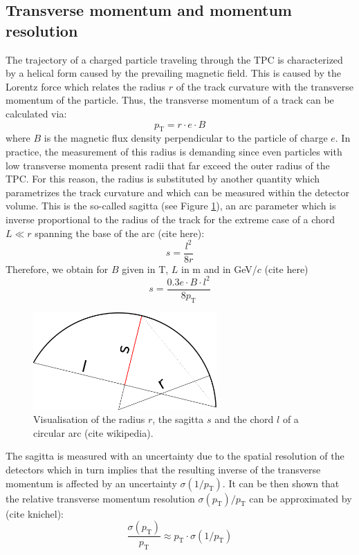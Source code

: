 \documentclass[12pt,a4paper]{report}
\begin{document}
\subsection{Transverse momentum and momentum resolution}
\label{ptandmomreso}
The trajectory of a charged particle traveling through the TPC is characterized by a helical form caused by the prevailing magnetic field. This is caused by the Lorentz force which relates the radius $r$ of the track curvature with the transverse momentum \pt of the particle. Thus, the transverse momentum of a track can be calculated via:
\begin{equation}
p_\text{T} = r \cdot e\cdot B
\label{radius}
\end{equation}
where $B$ is the magnetic flux density perpendicular to the particle of charge $e$. In practice, the measurement of this radius is demanding since even particles with low transverse momenta present radii that far exceed the outer radius of the TPC. For this reason, the radius is substituted by another quantity which parametrizes the track curvature and which can be measured within the detector volume. This is the so-called sagitta (see Figure \ref{Sagitta}), an arc parameter which is inverse proportional to the radius of the track for the extreme case of a chord $L \ll r$ spanning the base of the arc (cite here):
\begin{equation}
s = \dfrac{l^2}{8r}
\end{equation}
Therefore, we obtain for $B$ given in T, $L$ in m and \pt in GeV/$c$ (cite here)
\begin{equation}
s = \dfrac{0.3e \cdot B \cdot l^2}{8p_\text{T}}
\end{equation}
\begin{figure}[tb!]
\centering
\includegraphics[width=7cm]{Plots/Sagitta.png}  
\caption{Visualisation of the radius $r$, the sagitta $s$ and the chord $l$ of a circular arc (cite wikipedia).}
\label{Sagitta}
\end{figure}
\hspace{-0.25cm} The sagitta is measured with an uncertainty due to the spatial resolution of the detectors which in turn implies that the resulting inverse of the transverse momentum is affected by an uncertainty $\sigma(1/p_\text{T})$. It can be then shown that the relative transverse momentum resolution $\sigma(p_\text{T})/p_\text{T}$ can be approximated by (cite knichel):
\begin{equation}
\dfrac{\sigma(p_\text{T})}{p_\text{T}} \approx p_\text{T} \cdot \sigma(1/p_\text{T})
\label{equationRelSigma}
\end{equation}
\end{document}
